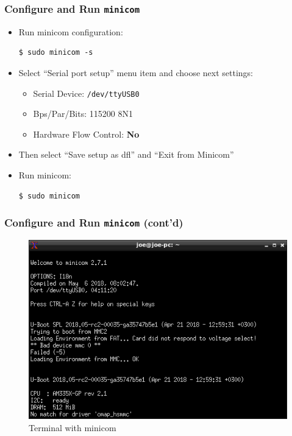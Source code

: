 \begin{frame}[fragile]
  \frametitle{Configure and Run \texttt{minicom}}
  \begin{itemize}
    \item Run minicom configuration:
    \begin{verbatim}
$ sudo minicom -s
    \end{verbatim}
    \item Select ``Serial port setup'' menu item and choose next settings:
      \begin{itemize}
        \item Serial Device: \texttt{/dev/ttyUSB0}
        \item Bps/Par/Bits: 115200 8N1
	\item Hardware Flow Control: \alert{\textbf{No}}
      \end{itemize}
    \item Then select ``Save setup as dfl'' and ``Exit from Minicom''
    \item Run minicom:
    \begin{verbatim}
$ sudo minicom
    \end{verbatim}
  \end{itemize}
\end{frame}

\begin{frame}
  \frametitle{Configure and Run \texttt{minicom} (cont'd)}
  \begin{figure}
    \centering
    \includegraphics[scale=0.6]{images/minicom.png}
    \caption{Terminal with minicom}
  \end{figure}
  \vspace*{-5mm} %
\end{frame}


